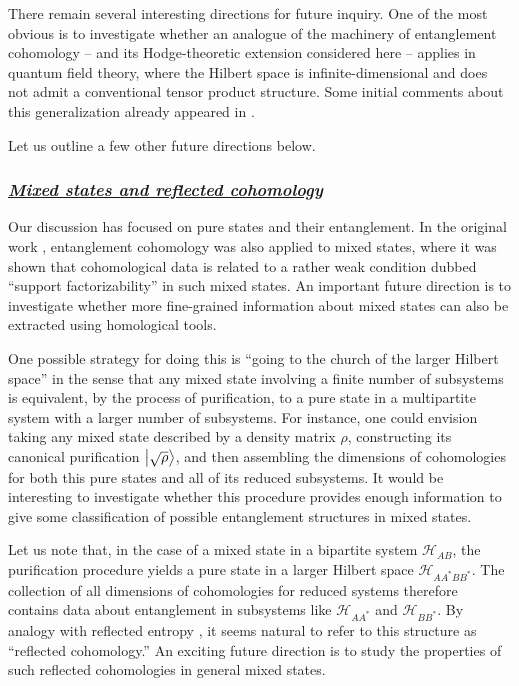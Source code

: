 \documentclass[12pt]{article}
\newcommand{\ul}[1]{{\underline{#1}}}
\numberwithin{equation}{section}
\begin{document}
There remain several interesting directions for future inquiry. One of the most obvious is to investigate whether an analogue of the machinery of entanglement cohomology -- and its Hodge-theoretic extension considered here -- applies in quantum field theory, where the Hilbert space is infinite-dimensional and does not admit a conventional tensor product structure. Some initial comments about this generalization already appeared in \cite{Mainiero:2019enr}.

Let us outline a few other future directions below.


\subsubsection*{\ul{\it Mixed states and reflected cohomology}}

Our discussion has focused on pure states and their entanglement. In the original work \cite{Mainiero:2019enr}, entanglement cohomology was also applied to mixed states, where it was shown that cohomological data is related to a rather weak condition dubbed ``support factorizability'' in such mixed states. An important future direction is to investigate whether more fine-grained information about mixed states can also be extracted using homological tools.

One possible strategy for doing this is ``going to the church of the larger Hilbert space'' in the sense that any mixed state involving a finite number of subsystems is equivalent, by the process of purification, to a pure state in a multipartite system with a larger number of subsystems. For instance, one could envision taking any mixed state described by a density matrix $\rho$, constructing its canonical purification $\ket{\sqrt{\rho}}$, and then assembling the dimensions of cohomologies for both this pure states and all of its reduced subsystems. It would be interesting to investigate whether this procedure provides enough information to give some classification of possible entanglement structures in mixed states.

Let us note that, in the case of a mixed state in a bipartite system $\mathcal{H}_{AB}$, the purification procedure yields a pure state in a larger Hilbert space $\mathcal{H}_{A A^\ast B B^\ast}$. The collection of all dimensions of cohomologies for reduced systems therefore contains data about entanglement in subsystems like $\mathcal{H}_{A A^\ast}$ and $\mathcal{H}_{B B^\ast}$. By analogy with reflected entropy \cite{Dutta:2019gen}, it seems natural to refer to this structure as ``reflected cohomology.'' An exciting future direction is to study the properties of such reflected cohomologies in general mixed states.
\end{document}
